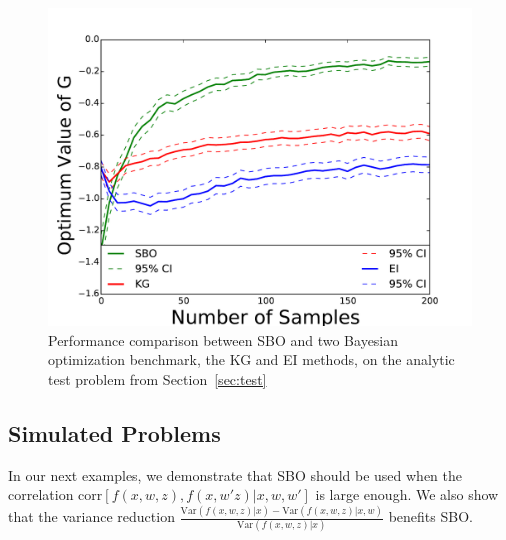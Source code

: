 \documentclass{article}
\newcommand{\w}{w}
\newcommand{\z}{z}
\begin{document}
\begin{figure}[!htb]
	\includegraphics[width=0.9\linewidth]{comparisonSameanal.pdf}
    \caption{Performance comparison between SBO and two Bayesian optimization benchmark, the KG and EI methods, on the analytic test problem from Section~\ref{sec:test} \label{fig:tahi7}}
\end{figure} 

\subsection{Simulated Problems}
\label{sec:GPexample}

In our next examples, we demonstrate that SBO should be used when the correlation $\mbox{corr}\left[f\left(x,w,z\right),f\left(x,w'z\right)|x,w,w'\right]$ is large enough. We also show that the variance reduction $\frac{\mbox{Var}\left(f\left(x,w,z\right)|x\right)-\mbox{Var}\left(f\left(x,w,z\right)|x,w\right)}{\mbox{Var}\left(f\left(x,w,z\right)|x\right)}$ benefits SBO.
\end{document}
